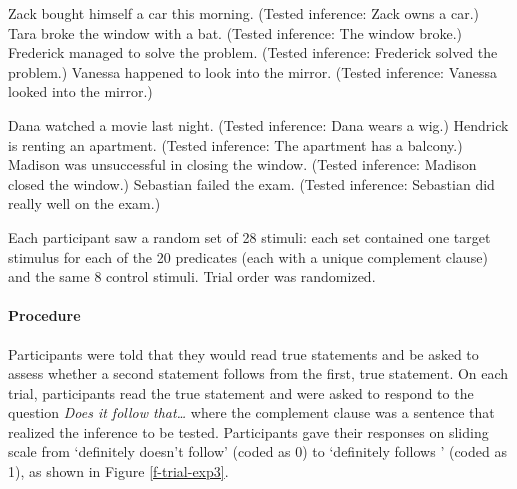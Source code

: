\documentclass[11pt,fleqn]{article}
\newcommand{\6}{\mbox{$[\hspace*{-.6mm}[$}}
\newcommand{\9}{\mbox{$]\hspace*{-.6mm}]$}}
\begin{document}
\begin{exe}
\ex\label{control-good2}
\begin{xlist}
 Zack bought himself a car this morning. (Tested inference: Zack owns a car.)
 Tara broke the window with a bat. (Tested inference: The window broke.)
 Frederick managed to solve the problem. (Tested inference: Frederick solved the problem.)
 Vanessa happened to look into the mirror. (Tested inference: Vanessa looked into the mirror.)
\end{xlist}
\ex\label{control-bad2}
\begin{xlist}
 Dana watched a movie last night. (Tested inference: Dana wears a wig.)
 Hendrick is renting an apartment. (Tested inference: The apartment has a balcony.)
 Madison was unsuccessful in closing the window. (Tested inference:  Madison closed the window.)
 Sebastian failed the exam. (Tested inference: Sebastian did really well on the exam.)
\end{xlist}
\end{exe}

Each participant saw a random set of 28 stimuli: each set contained one target stimulus for each of the 20 predicates (each with a unique complement clause) and the same 8 control stimuli. Trial order was randomized.

\paragraph{Procedure} Participants were told that they would read true statements and be asked to assess whether a second statement follows from the first, true statement. On each trial, participants read the true statement and were asked to respond to the question {\em Does it follow that\ldots} where the complement clause was a sentence that realized the inference to be tested.  Participants gave their responses on sliding scale from `definitely doesn't follow' (coded as 0) to `definitely follows ' (coded as 1), as shown in Figure \ref{f-trial-exp3}.
\end{document}
